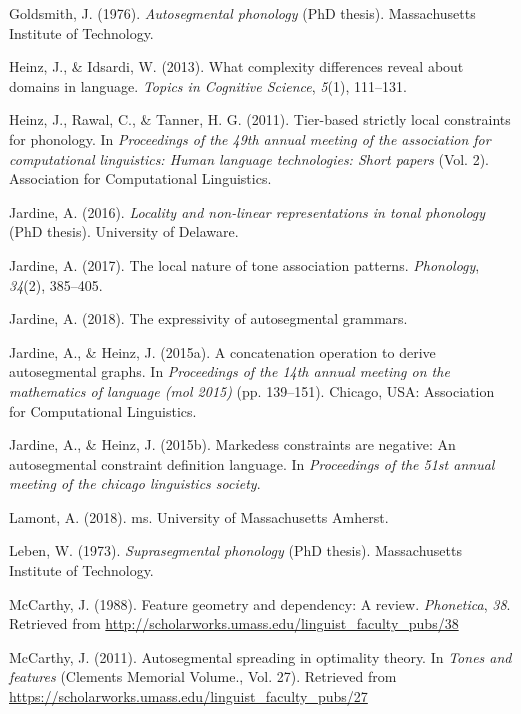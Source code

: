 \documentclass[,doc,floatsintext]{apa6}
\theoremstyle{definition}
\theoremstyle{definition}
\theoremstyle{definition}
\theoremstyle{remark}
\begin{document}
\hypertarget{ref-Goldsmith1976}{}
Goldsmith, J. (1976). \emph{Autosegmental phonology} (PhD thesis).
Massachusetts Institute of Technology.

\hypertarget{ref-heinzidsardi2013}{}
Heinz, J., \& Idsardi, W. (2013). What complexity differences reveal
about domains in language. \emph{Topics in Cognitive Science},
\emph{5}(1), 111--131.

\hypertarget{ref-heinzetaltsl}{}
Heinz, J., Rawal, C., \& Tanner, H. G. (2011). Tier-based strictly local
constraints for phonology. In \emph{Proceedings of the 49th annual
meeting of the association for computational linguistics: Human language
technologies: Short papers} (Vol. 2). Association for Computational
Linguistics.

\hypertarget{ref-jardinediss}{}
Jardine, A. (2016). \emph{Locality and non-linear representations in
tonal phonology} (PhD thesis). University of Delaware.

\hypertarget{ref-jardinelocaltone}{}
Jardine, A. (2017). The local nature of tone association patterns.
\emph{Phonology}, \emph{34}(2), 385--405.

\hypertarget{ref-jardineexpressag}{}
Jardine, A. (2018). The expressivity of autosegmental grammars.

\hypertarget{ref-jardineheinz2015}{}
Jardine, A., \& Heinz, J. (2015a). A concatenation operation to derive
autosegmental graphs. In \emph{Proceedings of the 14th annual meeting on
the mathematics of language (mol 2015)} (pp. 139--151). Chicago, USA:
Association for Computational Linguistics.

\hypertarget{ref-jardineheinzcls}{}
Jardine, A., \& Heinz, J. (2015b). Markedess constraints are negative:
An autosegmental constraint definition language. In \emph{Proceedings of
the 51st annual meeting of the chicago linguistics society}.

\hypertarget{ref-lamont2018}{}
Lamont, A. (2018). ms. University of Massachusetts Amherst.

\hypertarget{ref-leben1973}{}
Leben, W. (1973). \emph{Suprasegmental phonology} (PhD thesis).
Massachusetts Institute of Technology.

\hypertarget{ref-mccarthyfg1988}{}
McCarthy, J. (1988). Feature geometry and dependency: A review.
\emph{Phonetica}, \emph{38}. Retrieved from
\url{http://scholarworks.umass.edu/linguist_faculty_pubs/38}

\hypertarget{ref-mccarthy2011}{}
McCarthy, J. (2011). Autosegmental spreading in optimality theory. In
\emph{Tones and features} (Clements Memorial Volume., Vol. 27).
Retrieved from
\url{https://scholarworks.umass.edu/linguist_faculty_pubs/27}
\end{document}
